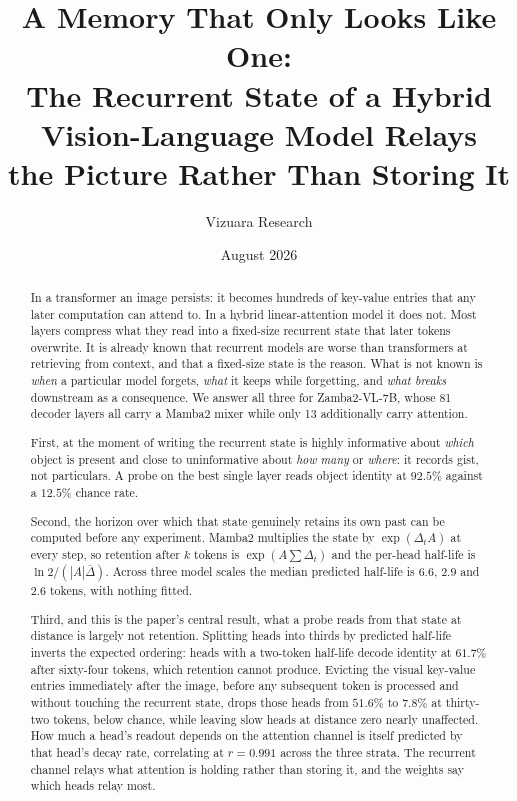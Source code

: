 \documentclass[11pt]{article}
\title{\bf A Memory That Only Looks Like One:\\[2pt]
\large The Recurrent State of a Hybrid Vision-Language Model Relays\\
the Picture Rather Than Storing It}
\author{Vizuara Research}
\date{August 2026}
\begin{document}
\maketitle

\begin{abstract}
\noindent
In a transformer an image persists: it becomes hundreds of key-value entries
that any later computation can attend to. In a hybrid linear-attention model it
does not. Most layers compress what they read into a fixed-size recurrent state
that later tokens overwrite. It is already known that recurrent models are
worse than transformers at retrieving from context, and that a fixed-size state
is the reason. What is not known is \emph{when} a particular model forgets,
\emph{what} it keeps while forgetting, and \emph{what breaks} downstream as a
consequence. We answer all three for Zamba2-VL-7B, whose 81 decoder layers all
carry a Mamba2 mixer while only 13 additionally carry attention.

First, at the moment of writing the recurrent state is highly informative about
\emph{which} object is present and close to uninformative about \emph{how many}
or \emph{where}: it records gist, not particulars. A probe on the best single
layer reads object identity at $92.5\%$ against a $12.5\%$ chance rate.

Second, the horizon over which that state genuinely retains its own past can be
computed before any experiment. Mamba2 multiplies the state by
$\exp(\Delta_t A)$ at every step, so retention after $k$ tokens is
$\exp(A\sum\Delta_t)$ and the per-head half-life is
$\ln 2/(|A|\bar{\Delta})$. Across three model scales the median predicted
half-life is $6.6$, $2.9$ and $2.6$ tokens, with nothing fitted.

Third, and this is the paper's central result, what a probe reads from that
state at distance is largely not retention. Splitting heads into thirds by
predicted half-life inverts the expected ordering: heads with a two-token
half-life decode identity at $61.7\%$ after sixty-four tokens, which retention
cannot produce. Evicting the visual key-value entries immediately after the
image, before any subsequent token is processed and without touching the
recurrent state, drops those heads from $51.6\%$ to $7.8\%$ at thirty-two
tokens, below chance, while leaving slow heads at distance zero nearly
unaffected. How much a head's readout depends on the attention channel is
itself predicted by that head's decay rate, correlating at $r = 0.991$ across
the three strata. The recurrent channel relays what attention is holding rather
than storing it, and the weights say which heads relay most.


\end{abstract}
\end{document}
